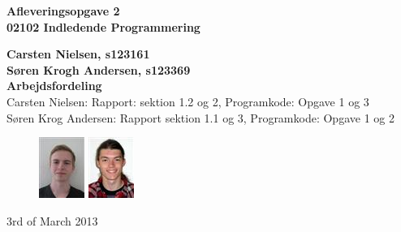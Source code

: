 \thispagestyle{empty} %
\hspace{6cm} \vspace{3cm}
\begin{center}
\textbf{\Huge {Afleveringsopgave 2}\\ \vspace{1cm}
\huge{02102 Indledende Programmering}}
\end{center}
\vspace{1cm}
\begin{center}
\Large{\textbf{Carsten Nielsen, s123161 \\ Søren Krogh Andersen, s123369}} \\
\vspace{1cm}
\Large{\textbf{Arbejdsfordeling}} \\
Carsten Nielsen: Rapport: sektion 1.2 og 2, Programkode: Opgave 1 og 3 \\
Søren Krog Andersen: Rapport sektion 1.1 og 3, Programkode: Opgave 1 og 2
\end{center}
\vspace{6cm}
\begin{figure}[h]
\hfill
\includegraphics{s123161.png}%
\includegraphics{s123369.png}%
\end{figure}
3rd of March 2013

\thispagestyle{empty}
